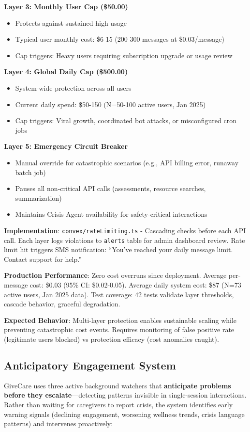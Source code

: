 \documentclass{article}
\begin{document}
\textbf{Layer 3: Monthly User Cap (\$50.00)}
\begin{itemize}
    \item Protects against sustained high usage
    \item Typical user monthly cost: \$6-15 (200-300 messages at \$0.03/message)
    \item Cap triggers: Heavy users requiring subscription upgrade or usage review
\end{itemize}

\textbf{Layer 4: Global Daily Cap (\$500.00)}
\begin{itemize}
    \item System-wide protection across all users
    \item Current daily spend: \$50-150 (N=50-100 active users, Jan 2025)
    \item Cap triggers: Viral growth, coordinated bot attacks, or misconfigured cron jobs
\end{itemize}

\textbf{Layer 5: Emergency Circuit Breaker}
\begin{itemize}
    \item Manual override for catastrophic scenarios (e.g., API billing error, runaway batch job)
    \item Pauses all non-critical API calls (assessments, resource searches, summarization)
    \item Maintains Crisis Agent availability for safety-critical interactions
\end{itemize}

\textbf{Implementation}: \texttt{convex/rateLimiting.ts} - Cascading checks before each API call. Each layer logs violations to \texttt{alerts} table for admin dashboard review. Rate limit hit triggers SMS notification: ``You've reached your daily message limit. Contact support for help.''

\textbf{Production Performance}: Zero cost overruns since deployment. Average per-message cost: \$0.03 (95\% CI: \$0.02-0.05). Average daily system cost: \$87 (N=73 active users, Jan 2025 data). Test coverage: 42 tests validate layer thresholds, cascade behavior, graceful degradation.

\textbf{Expected Behavior}: Multi-layer protection enables sustainable scaling while preventing catastrophic cost events. Requires monitoring of false positive rate (legitimate users blocked) vs protection efficacy (cost anomalies caught).

%
\subsection{Anticipatory Engagement System}%
\label{subsec:AnticipatorEngagementSystem}%
GiveCare uses three active background watchers that \textbf{anticipate problems before they escalate}—detecting patterns invisible in single-session interactions. Rather than waiting for caregivers to report crisis, the system identifies early warning signals (declining engagement, worsening wellness trends, crisis language patterns) and intervenes proactively:
\end{document}
